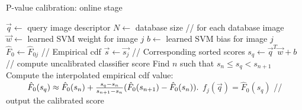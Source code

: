        \begin{algorithm}
          \caption{P-value calibration: online stage}
          \label{alg:online}
        \begin{algorithmic}[1]
              \State $\vec{q} \gets$ query image descriptor
              \State $N \gets$ database size
               // for each database image
                \State $\vec{w} \gets$ learned SVM weight for image $j$
                \State $b \gets$ learned SVM bias for image $j$
                \State $\hat{F}_{0} \gets \hat{F}_{0j}$ // Empirical cdf
                \State $\vec{s} \gets \vec{s_j}$ // Corresponding sorted scores
                \State $s_q \gets \vec{q}^T\vec{w}+b$  // compute uncalibrated classifier score 
                \State Find $n$ such that $s_{n} \leq s_q < s_{n+1} $
                \State Compute the interpolated empirical cdf value:
                \Statex $\hspace{9mm}
                  \hat{F}_0(s_q)\approx 
                  \hat{F}_0(s_n)+\frac{s_q-s_n}{s_{n+1}-s_n} (\hat{F}_0(s_{n+1})-\hat{F}_0(s_n)).
                $
                \State $f_j(\vec{q})=\hat{F}_0(s_q)$ // output the calibrated score

              \EndFor
              \EndProcedure
        \end{algorithmic}
      \end{algorithm}
      

